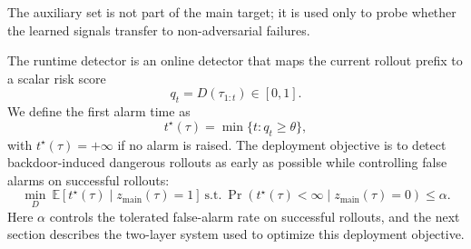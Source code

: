 The auxiliary  set is not part of the main target;
it is used only to probe whether the learned signals transfer to
non-adversarial failures.

The runtime detector is an online detector that maps the current
rollout prefix to a scalar risk score
\[
  q_t = D(\tau_{1:t}) \in [0,1].
\]
We define the first alarm time as
\[
  t^\star(\tau) = \min \{ t : q_t \ge \theta \},
\]
with $t^\star(\tau)=+\infty$ if no alarm is raised.
The deployment objective is to detect backdoor-induced dangerous
rollouts as early as possible while controlling false alarms on
successful rollouts:
\[
  \min_D \ \mathbb{E}\!\left[t^\star(\tau)\mid z_{\mathrm{main}}(\tau)=1\right]
  \
  \mathrm{s.t.}
  \
  \Pr\!\left(t^\star(\tau)<\infty \mid z_{\mathrm{main}}(\tau)=0\right)\le \alpha.
\]
Here $\alpha$ controls the tolerated false-alarm rate on successful
rollouts, and the next section describes the two-layer system used to
optimize this deployment objective.
